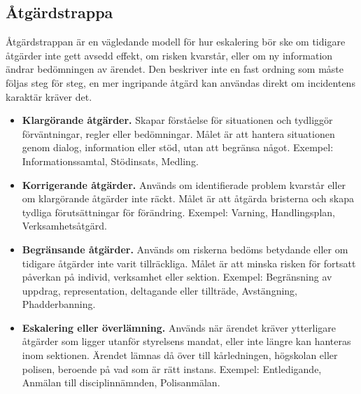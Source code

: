 


\subsection{Åtgärdstrappa}
Åtgärdstrappan är en vägledande modell för hur eskalering bör ske om tidigare åtgärder inte gett avsedd effekt, om risken kvarstår, eller om ny information ändrar bedömningen av ärendet. Den beskriver inte en fast ordning som måste följas steg för steg, en mer ingripande åtgärd kan användas direkt om incidentens karaktär kräver det.

\begin{itemize}
\item \textbf{Klargörande åtgärder.} Skapar förståelse för situationen och tydliggör förväntningar, regler eller bedömningar. Målet är att hantera situationen genom dialog, information eller stöd, utan att begränsa något. Exempel: Informationssamtal, Stödinsats, Medling.
\item \textbf{Korrigerande åtgärder.} Används om identifierade problem kvarstår eller om klargörande åtgärder inte räckt. Målet är att åtgärda bristerna och skapa tydliga förutsättningar för förändring. Exempel: Varning, Handlingsplan, Verksamhetsåtgärd.
\item \textbf{Begränsande åtgärder.} Används om riskerna bedöms betydande eller om tidigare åtgärder inte varit tillräckliga. Målet är att minska risken för fortsatt påverkan på individ, verksamhet eller sektion. Exempel: Begränsning av uppdrag, representation, deltagande eller tillträde, Avstängning, Phadderbanning.
\item \textbf{Eskalering eller överlämning.} Används när ärendet kräver ytterligare åtgärder som ligger utanför styrelsens mandat, eller inte längre kan hanteras inom sektionen. Ärendet lämnas då över till kårledningen, högskolan eller polisen, beroende på vad som är rätt instans. Exempel: Entledigande, Anmälan till disciplinnämnden, Polisanmälan.
\end{itemize}


